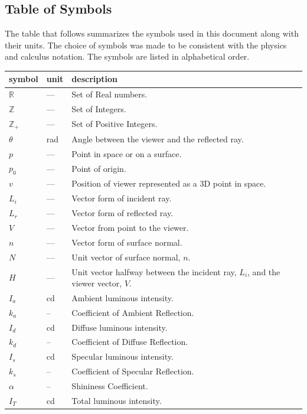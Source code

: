 \documentclass[12pt, titlepage]{article}
\begin{document}
\subsection{Table of Symbols}

The table that follows summarizes the symbols used in this document along with
their units.  The choice of symbols was made to be consistent with the physics
and calculus notation. The symbols are listed in alphabetical order.

\renewcommand{\arraystretch}{1.2}
\noindent \begin{longtable*}{l l p{12cm}} \toprule
	\textbf{symbol} & \textbf{unit} & \textbf{description}\\
	\midrule 
	$\mathbb{R}$ & --- & Set of Real numbers.\\
	$\mathbb{Z}$ & --- & Set of Integers.\\
	$\mathbb{Z_{+}}$ & --- & Set of Positive Integers.\\
	$\theta$ & \si[per-mode=symbol] {\radian} & Angle between the viewer and the
	reflected ray.	\\
	$p$ & --- & Point in space or on a surface.
	\\
	$p_{0}$ & --- & Point of origin.
	\\
	$v$ & --- & Position of viewer represented as a 3D point in space.
	\\
	$L_{i}$ & --- & Vector form of incident ray.
	\\
	$L_{r}$ & --- & Vector form of reflected ray.
	\\
	$V$ & --- & Vector from point to the viewer.
	\\
	$n$ & --- & Vector form of surface normal.
	\\
	$N$ & --- & Unit vector of surface normal, $n$.
	\\
	$H$ & --- & Unit vector halfway between the incident ray, $L_{i}$, and
	the viewer vector, $V$.
	\\
	$I_{a}$ & cd & Ambient luminous intensity.
	\\
	$k_{a}$ & -- & Coefficient of Ambient Reflection.
	\\
	$I_{d}$ & cd & Diffuse luminous intensity.
	\\
	$k_{d}$ & -- & Coefficient of Diffuse Reflection.
	\\
	$I_{s}$ & cd & Specular luminous intensity.
	\\
	$k_{s}$ & -- & Coefficient of Specular Reflection.
	\\
	$\alpha$ & -- & Shininess Coefficient.
	\\
	$I_{T}$ & cd & Total luminous intensity.
	\\
	\bottomrule
\end{longtable*}
\end{document}
